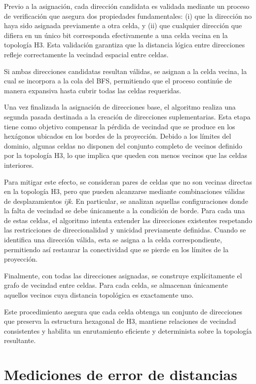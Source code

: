 Previo a la asignación, cada dirección candidata es validada mediante un proceso de verificación que asegura dos propiedades fundamentales: (i) que la dirección no haya sido asignada previamente a otra celda, y (ii) que cualquier dirección que difiera en un único bit corresponda efectivamente a una celda vecina en la topología H3. Esta validación garantiza que la distancia lógica entre direcciones refleje correctamente la vecindad espacial entre celdas.

Si ambas direcciones candidatas resultan válidas, se asignan a la celda vecina, la cual se incorpora a la cola del BFS, permitiendo que el proceso continúe de manera expansiva hasta cubrir todas las celdas requeridas.

Una vez finalizada la asignación de direcciones base, el algoritmo realiza una segunda pasada destinada a la creación de direcciones suplementarias. Esta etapa tiene como objetivo compensar la pérdida de vecindad que se produce en los hexágonos ubicados en los bordes de la proyección. Debido a los límites del dominio, algunas celdas no disponen del conjunto completo de vecinos definido por la topología H3, lo que implica que queden con menos vecinos que las celdas interiores.

Para mitigar este efecto, se consideran pares de celdas que no son vecinas directas en la topología H3, pero que pueden alcanzarse mediante combinaciones válidas de desplazamientos \textit{ijk}. En particular, se analizan aquellas configuraciones donde la falta de vecindad se debe únicamente a la condición de borde. Para cada una de estas celdas, el algoritmo intenta extender las direcciones existentes respetando las restricciones de direccionalidad y unicidad previamente definidas. Cuando se identifica una dirección válida, esta se asigna a la celda correspondiente, permitiendo así restaurar la conectividad que se pierde en los límites de la proyección.

Finalmente, con todas las direcciones asignadas, se construye explícitamente el grafo de vecindad entre celdas. Para cada celda, se almacenan únicamente aquellos vecinos cuya distancia topológica es exactamente uno.

Este procedimiento asegura que cada celda obtenga un conjunto de direcciones que preserva la estructura hexagonal de H3, mantiene relaciones de vecindad consistentes y habilita un enrutamiento eficiente y determinista sobre la topología resultante.


\section{Mediciones de error de distancias}

